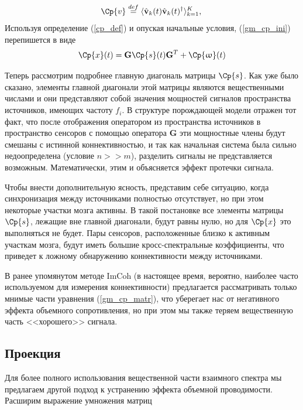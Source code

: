 \begin{equation}
    \Cp{v} \stackrel{def}{=} \langle{\hat{\mathbf{v}}_k(t) \hat{\mathbf{v}}_k(t)^{\dag}}\rangle_{k=1}^K, \\
    \label{cp_def}
\end{equation} 
Используя определение (\ref{cp_def}) и опуская начальные условия, (\ref{gm_cp_ini})
перепишется в виде
\begin{equation}
    \Cp{x}(t) = \mathbf{G} \Cp{s}(t) \mathbf{G}^T + \Cp{\omega}(t)
    \label{gm_cp_matr}
\end{equation}

Теперь рассмотрим подробнее главную диагональ матрицы $\Cp{s}$.
Как уже было сказано, элементы главной диагонали этой матрицы являются вещественными числами
и они представляют собой значения мощностей сигналов пространства источников,
имеющих частоту $f_i$. В структуре порождающей модели отражен тот факт,
что после отображения оператором из пространства источников в пространство сенсоров
с помощью оператора $\mathbf{G}$ эти мощностные члены будут смешаны с истинной коннективностью,
и так как начальная система была сильно недоопределена (условие $n >> m$),
разделить сигналы не представляется возможным.
Математически, этим и объясняется эффект протечки сигнала. 

Чтобы внести дополнительную ясность, представим себе ситуацию,
когда синхронизация между источниками полностью отсутствует,
но при этом некоторые участки мозга активны.
В такой постановке все элементы матрицы $\Cp{s}$, лежащие вне главной диагонали,
будут равны нулю, но для $\Cp{x}$ это выполняться не будет.
Пары сенсоров, расположенные близко к активным участкам мозга,
будут иметь большие кросс-спектральные коэффициенты,
что приведет к ложному обнаружению коннективности между источниками.

В ранее упомянутом методе ImCoh (в настоящее время, вероятно,
наиболее часто используемом для измерения коннективности)
предлагается рассматривать только мнимые части уравнения (\ref{gm_cp_matr}),
что уберегает нас от негативного эффекта объемного сопротивления,
но при этом мы также теряем вещественную часть <<хорошего>> сигнала.

\subsection{Проекция}

Для более полного использования вещественной части взаимного спектра мы предлагаем другой подход к устранению эффекта объемной проводимости. Расширим выражение умножения матриц 


